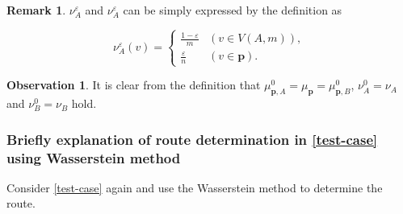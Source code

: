 \documentclass{article}
\numberwithin{equation}{section}
\theoremstyle{definition}
\newtheorem{remark}[remark]{Remark}
\newtheorem{observation}[observation]{Observation}
\newcommand{\eps}{\varepsilon} %
\begin{document}
\begin{remark}
$\nu_A^\eps$ and $\nu_A^\eps$ can be simply expressed by the definition as 
\begin{center} \vspace{-4mm}
\[ \nu_A^\eps(v) = 
\begin{cases}
\frac{1-\eps}{m} & (v\in V(A,m)),   \\
\frac{\eps}{n} & (v\in\mathbf{p}) .
\end{cases}\]
\end{center} 
\end{remark}

\begin{observation}
It is clear from the definition that $\mu_{\mathbf{p},A}^0=\mu_\mathbf{p}=\mu_{\mathbf{p},B}^0$, $\nu_A^0=\nu_A$ and $\nu_B^0=\nu_B$ hold.
\end{observation}


\subsubsection{Briefly explanation of route determination in \autoref{test-case} using Wasserstein method}

Consider \autoref{test-case} again and use the Wasserstein method to determine the route.
\end{document}

